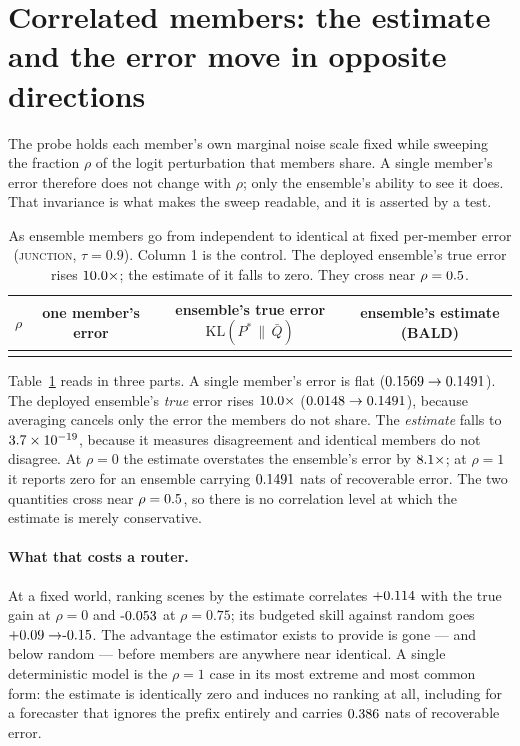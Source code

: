 \documentclass[10pt]{article}
\newcommand{\Pstar}{P^{*}}
\newcommand{\KL}[2]{\mathrm{KL}(#1\,\|\,#2)}
\begin{document}
\section{Correlated members: the estimate and the error move in opposite directions}
\label{sec:confound}

The probe holds each member's own marginal noise scale fixed while sweeping the fraction $\rho$ of
the logit perturbation that members share. A single member's error therefore does not change with
$\rho$; only the ensemble's ability to see it does. That invariance is what makes the sweep
readable, and it is asserted by a test.

\begin{table}[t]
\centering
\small
\caption{As ensemble members go from independent to identical at fixed per-member error
(\textsc{junction}, $\tau{=}0.9$). Column 1 is the control. The deployed ensemble's true error
rises $10.0\times$; the estimate of it falls to zero. They cross near $\rho=0.5$.}
\label{tab:confound}
\begin{tabular}{lccc}
\toprule
$\rho$ & one member's error & ensemble's \textbf{true} error $\KL{\Pstar}{\bar Q}$ & ensemble's \textbf{estimate} (BALD) \\
\midrule
 \\
\bottomrule
\end{tabular}
\end{table}

Table~\ref{tab:confound} reads in three parts. A single member's error is flat
($0.1569 \to 0.1491$). The deployed ensemble's \emph{true} error rises
$10.0\times$ ($0.0148 \to 0.1491$), because averaging cancels only the error the
members do not share. The \emph{estimate} falls to $3.7\times 10^{-19}$, because it measures disagreement
and identical members do not disagree. At $\rho=0$ the estimate overstates the ensemble's error by
$8.1\times$; at $\rho=1$ it reports zero for an ensemble carrying $0.1491$ nats of
recoverable error. The two quantities cross near $\rho=0.5$, so there is no correlation
level at which the estimate is merely conservative.

\paragraph{What that costs a router.} At a fixed world, ranking scenes by the estimate correlates
$+0.114$ with the true gain at $\rho=0$ and $\RoutBaldRhoHigh$ at $\rho=0.75$; its
budgeted skill against random goes $\RoutSkillBaldRhoZero \to \RoutSkillBaldRhoHigh$. The
advantage the estimator exists to provide is gone --- and below random --- before members are
anywhere near identical. A single deterministic model is the $\rho=1$ case in its most extreme and
most common form: the estimate is identically zero and induces no ranking at all, including for a
forecaster that ignores the prefix entirely and carries $0.386$ nats of recoverable
error.
\end{document}

